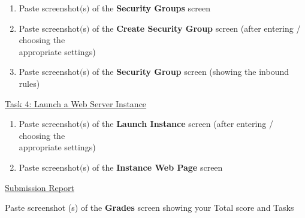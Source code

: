 \documentclass[11pt]{article}
\begin{document}
\begin{enumerate}[resume]
    \item Paste screenshot$($s$)$ of the \textbf{Security Groups} screen \\
    \vspace{5mm}
    
    \item Paste screenshot$($s$)$ of the \textbf{Create Security Group} screen (after entering / choosing the \\ appropriate settings) \\
    \vspace{5mm}
    
    \item Paste screenshot$($s$)$ of the \textbf{Security Group} screen (showing the inbound rules) \\
    \vspace{5mm}
\end{enumerate}


\vspace{1cm}

\noindent\underline{Task 4: Launch a Web Server Instance}

\begin{enumerate}[resume]
    \item Paste screenshot$($s$)$ of the \textbf{Launch Instance} screen (after entering / choosing the \\ appropriate settings) \\
    \vspace{5mm}
    
    \item Paste screenshot$($s$)$ of the \textbf{Instance Web Page} screen \\
    \vspace{5mm}
\end{enumerate}

\noindent\underline{Submission Report}

\vspace{0.5cm}

\noindent Paste screenshot (s) of the \textbf{Grades} screen showing your Total score and Tasks \\
\vspace{5mm}
\end{document}
